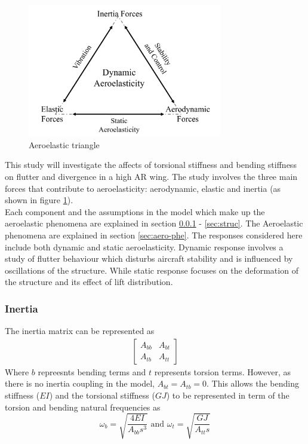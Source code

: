 \documentclass[11pt]{article}
\begin{document}
\begin{figure}
    \includegraphics[width=8.5cm]{figures/aerotri.png}
    \caption{Aeroelastic triangle}
    \label{fig:aero-tri}
\end{figure} 

This study will investigate the affects of torsional stiffness and bending stiffness on flutter and divergence in a high AR wing. The study involves the three main forces that contribute to aeroelasticity: aerodynamic, elastic and inertia (as shown in figure \ref{fig:aero-tri}).\\

Each component and the assumptions in the model which make up the aeroelastic phenomena are explained in section \ref{sec:inertia} - \ref{sec:struc}. The Aeroelastic phenomena are explained in section \ref{sec:aero-phe}. The responses considered here include both dynamic and static aeroelasticity. Dynamic response involves a study of flutter behaviour which disturbs aircraft stability and is influenced by oscillations of the structure. While static response focuses on the deformation of the structure and its effect of lift distribution.
\newpage
\subsubsection{Inertia}
\label{sec:inertia}
The inertia matrix can be represented as 
\begin{gather*}
    \begin{bmatrix}A_{bb} & A_{bt} \\ A_{tb} & A_{tt} \end{bmatrix}
\end{gather*}
Where $b$ repreesnts bending terms and $t$ represents torsion terms. However, as there is no inertia coupling in the model, $A_{bt} = A_{tb} = 0$. This allows the bending stiffness ($EI$) and the torsional stiffness ($GJ$) to be represented in term of the torsion and bending natural frequencies as
\begin{equation}
    \omega_b = \sqrt{\frac{4EI}{A_{bb}s^3}} \text{ and } \omega_t = \sqrt{\frac{GJ}{A_{tt}s}}
\end{equation}
\end{document}
